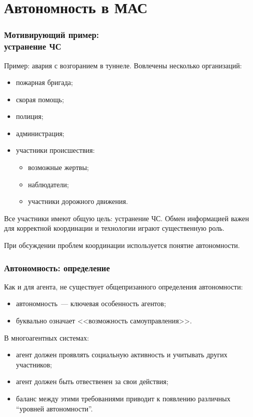 \documentclass{beamer}
\begin{document}
\section{Автономность в МАС}

\begin{frame}
  \frametitle{Мотивирующий пример: \\ устранение ЧС}
  Пример: авария с возгоранием в туннеле. Вовлечены несколько организаций:
  \begin{itemize}
    \item пожарная бригада;
    \item скорая помощь;
    \item полиция;
    \item администрация;
    \item участники происшествия:
      \begin{itemize}
        \item возможные жертвы;
        \item наблюдатели;
        \item участники дорожного движения.
      \end{itemize}
  \end{itemize}

  Все участники имеют общую цель: устранение ЧС. Обмен информацией важен для корректной
  координации и технологии играют существенную роль.

  При обсуждении проблем координации используется понятие автономности.
\end{frame}

\begin{frame}
  \frametitle{Автономность: определение}
  Как и для агента, не существует общепризанного определения автономности:
  \begin{itemize}
    \item автономность~--- ключевая особенность агентов;
    \item буквально означает <<возможность самоуправления>>.
  \end{itemize}

  В многоагентных системах:
  \begin{itemize}
    \item агент должен проявлять социальную активность и учитывать других участников;
    \item агент должен быть отвественен за свои действия;
    \item баланс между этими требованиями приводит к появлению различных ``уровней автономности''.
  \end{itemize}
\end{frame}
\end{document}

